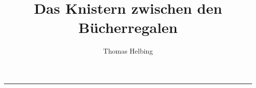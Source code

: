 \documentclass[output=paper]{langscibook}
\title{Das Knistern zwischen den Bücherregalen}
\author{Thomas Helbing}
\begin{document}
\maketitle



\begin{center}\rule{0.5\linewidth}{0.5pt}\end{center}

\end{document}

